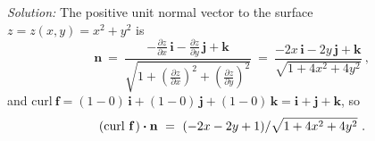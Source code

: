 \begin{exmp}
{
 }
 \par\noindent\emph{Solution:} The positive unit normal vector to the surface\\$z=z(x,y)=x^2 + y^2$ is
 \begin{displaymath}
  \textbf{n} ~=~
   \frac{-\frac{\partial z}{\partial x}\,\textbf{i} - \frac{\partial z}{\partial y}\,\textbf{j} +
   \textbf{k}}{\sqrt{1 + \left( \tfrac{\partial z}{\partial x} \right)^2 +
   \left( \tfrac{\partial z}{\partial y} \right)^2}} ~=~
   \frac{-2x\,\textbf{i} - 2y\,\textbf{j} + \textbf{k}}{\sqrt{1 + 4x^2 + 4y^2}} ~,
 \end{displaymath}
 and $\text{curl}~\textbf{f}= (1-0)\,\textbf{i}+(1-0)\,\textbf{j}+(1-0)\,\textbf{k} = \textbf{i}+\textbf{j}+\textbf{k}$,
 so
 \begin{displaymath}
  (\text{curl}~{\textbf{f}}\,) \bm{\cdot} \textbf{n} ~=~ (-2x-2y+1)/\sqrt{1 + 4x^2 + 4y^2} ~.
 \end{displaymath}
 

\end{exmp}
